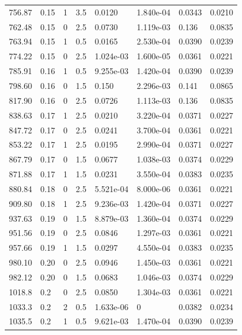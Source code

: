 \documentclass[preview]{standalone}
\begin{document}
{{{\begin{tabular}{L{1.2cm}C{1.2cm} C{0.3cm}C{0.5cm} C{1.4cm}C{1.4cm} C{1.4cm}C{1.4cm}}
  756.87  &  0.15  & 1     & 3.5 &  0.0120  & 1.840e-04  & 0.0343 &  0.0210   \\ 
  762.48  &  0.15  & 0     & 2.5 &  0.0730  & 1.119e-03  & 0.136 &  0.0835   \\ 
  763.94  &  0.15  & 1     & 0.5 &  0.0165  & 2.530e-04  & 0.0390 &  0.0239   \\ 
  774.22  &  0.15  & 0     & 2.5 &  1.024e-03  & 1.600e-05  & 0.0361 &  0.0221   \\ 
  785.91  &  0.16  & 1     & 0.5 &  9.255e-03  & 1.420e-04  & 0.0390 &  0.0239   \\ 
  798.60  &  0.16  & 0     & 1.5 &  0.150  & 2.296e-03  & 0.141 &  0.0865   \\ 
  817.90  &  0.16  & 0     & 2.5 &  0.0726  & 1.113e-03  & 0.136 &  0.0835   \\ 
  838.63  &  0.17  & 1     & 2.5 &  0.0210  & 3.220e-04  & 0.0371 &  0.0227   \\ 
  847.72  &  0.17  & 0     & 2.5 &  0.0241  & 3.700e-04  & 0.0361 &  0.0221   \\ 
  853.22  &  0.17  & 1     & 2.5 &  0.0195  & 2.990e-04  & 0.0371 &  0.0227   \\ 
  867.79  &  0.17  & 0     & 1.5 &  0.0677  & 1.038e-03  & 0.0374 &  0.0229   \\ 
  871.88  &  0.17  & 1     & 1.5 &  0.0231  & 3.550e-04  & 0.0383 &  0.0235   \\ 
  880.84  &  0.18  & 0     & 2.5 &  5.521e-04  & 8.000e-06  & 0.0361 &  0.0221   \\ 
  909.80  &  0.18  & 1     & 2.5 &  9.236e-03  & 1.420e-04  & 0.0371 &  0.0227   \\ 
  937.63  &  0.19  & 0     & 1.5 &  8.879e-03  & 1.360e-04  & 0.0374 &  0.0229   \\ 
  951.56  &  0.19  & 0     & 2.5 &  0.0846  & 1.297e-03  & 0.0361 &  0.0221   \\ 
  957.66  &  0.19  & 1     & 1.5 &  0.0297  & 4.550e-04  & 0.0383 &  0.0235   \\ 
  980.10  &  0.20  & 0     & 2.5 &  0.0946  & 1.450e-03  & 0.0361 &  0.0221   \\ 
  982.12  &  0.20  & 0     & 1.5 &  0.0683  & 1.046e-03  & 0.0374 &  0.0229   \\ 
  1018.8  &   0.2  & 0     & 2.5 &  0.0850  & 1.304e-03  & 0.0361 &  0.0221   \\ 
  1033.3  &   0.2  & 2     & 0.5 &  1.633e-06  & 0  & 0.0382 &  0.0234   \\ 
  1035.5  &   0.2  & 1     & 0.5 &  9.621e-03  & 1.470e-04  & 0.0390 &  0.0239   \\ 

\end{tabular}}}}
\end{document}
